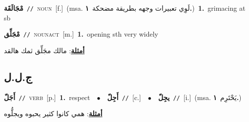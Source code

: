 \documentclass[10pt,a4paper,twoside]{article} %
\begin{document}
\begin{multicols}{2}
{\setlength\topsep{0pt}\textbf{\foreignlanguage{arabic}{مْجَالَقَة}}\ {\color{gray}\texttt{//}\color{black}}\ \textsc{noun}\ [f.]\ \color{gray}(msa. \foreignlanguage{arabic}{لَوِي تعبيرات وجهه بطريقة مضحكة}~\foreignlanguage{arabic}{\textbf{١.}})\color{black}\ \textbf{1.}~grimacing at sb\ } \vspace{2mm}

{\setlength\topsep{0pt}\textbf{\foreignlanguage{arabic}{مْجَلِّق}}\ {\color{gray}\texttt{//}\color{black}}\ \textsc{noun\textunderscore act}\ [m.]\ \textbf{1.}~opening sth very widely\  \begin{flushright}\color{gray}\foreignlanguage{arabic}{\textbf{\underline{\foreignlanguage{arabic}{أمثلة}}}: مالك مجَلِّق ثمك هالقد}\end{flushright}\color{black}} \vspace{2mm}

\vspace{-3mm}
\subsection*{\color{blue}\foreignlanguage{arabic}{ج.ل.ل}\color{blue}{}} 

{\setlength\topsep{0pt}\textbf{\foreignlanguage{arabic}{أَجَلّ}}\ {\color{gray}\texttt{//}\color{black}}\ \textsc{verb}\ [p.]\ \textbf{1.}~respect\ \ $\bullet$\ \ \setlength\topsep{0pt}\textbf{\foreignlanguage{arabic}{أَجِلّ}}\ {\color{gray}\texttt{//}\color{black}}\ [c.]\ \ $\bullet$\ \ \setlength\topsep{0pt}\textbf{\foreignlanguage{arabic}{يجِلّ}}\ {\color{gray}\texttt{//}\color{black}}\ [i.]\ \color{gray}(msa. \foreignlanguage{arabic}{يَحْتَرِم}~\foreignlanguage{arabic}{\textbf{١.}})\color{black}\  \begin{flushright}\color{gray}\foreignlanguage{arabic}{\textbf{\underline{\foreignlanguage{arabic}{أمثلة}}}: همي كانوا كثير يحبوه ويجلُّوه}\end{flushright}\color{black}} \vspace{2mm}


\end{multicols}
\end{document}
